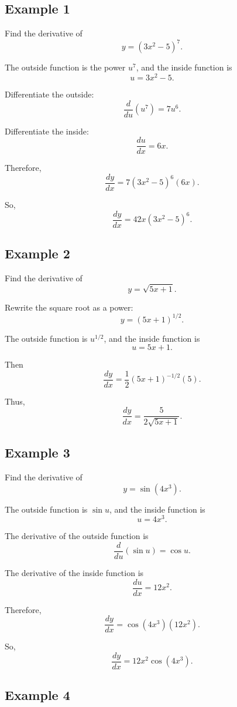 \documentclass[12pt]{article}
\begin{document}
	\subsection*{Example 1}
	
	Find the derivative of
	\[
	y=(3x^2-5)^7.
	\]
	
	The outside function is the power \(u^7\), and the inside function is
	\[
	u=3x^2-5.
	\]
	
	Differentiate the outside:
	\[
	\frac{d}{du}(u^7)=7u^6.
	\]
	
	Differentiate the inside:
	\[
	\frac{du}{dx}=6x.
	\]
	
	Therefore,
	\[
	\frac{dy}{dx}=7(3x^2-5)^6(6x).
	\]
	
	So,
	\[
	\boxed{\frac{dy}{dx}=42x(3x^2-5)^6.}
	\]
	
	\subsection*{Example 2}
	
	Find the derivative of
	\[
	y=\sqrt{5x+1}.
	\]
	
	Rewrite the square root as a power:
	\[
	y=(5x+1)^{1/2}.
	\]
	
	The outside function is \(u^{1/2}\), and the inside function is
	\[
	u=5x+1.
	\]
	
	Then
	\[
	\frac{dy}{dx}
	=
	\frac{1}{2}(5x+1)^{-1/2}(5).
	\]
	
	Thus,
	\[
	\boxed{\frac{dy}{dx}=\frac{5}{2\sqrt{5x+1}}.}
	\]
	
	\subsection*{Example 3}
	
	Find the derivative of
	\[
	y=\sin(4x^3).
	\]
	
	The outside function is \(\sin u\), and the inside function is
	\[
	u=4x^3.
	\]
	
	The derivative of the outside function is
	\[
	\frac{d}{du}(\sin u)=\cos u.
	\]
	
	The derivative of the inside function is
	\[
	\frac{du}{dx}=12x^2.
	\]
	
	Therefore,
	\[
	\frac{dy}{dx}=\cos(4x^3)(12x^2).
	\]
	
	So,
	\[
	\boxed{\frac{dy}{dx}=12x^2\cos(4x^3).}
	\]
	
	\subsection*{Example 4}
	
\end{document}
